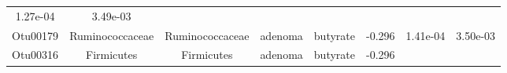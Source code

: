\documentclass[11pt,]{article}
\begin{document}
\begin{longtable}[]{@{}cccccccc@{}}
\begin{minipage}[t]{0.08\columnwidth}
1.27e-04\strut
\end{minipage} & \begin{minipage}[t]{0.08\columnwidth}\centering\strut
3.49e-03\strut
\end{minipage}\tabularnewline
\begin{minipage}[t]{0.08\columnwidth}\centering\strut
Otu00179\strut
\end{minipage} & \begin{minipage}[t]{0.15\columnwidth}\centering\strut
Ruminococcaceae\strut
\end{minipage} & \begin{minipage}[t]{0.15\columnwidth}\centering\strut
Ruminococcaceae\strut
\end{minipage} & \begin{minipage}[t]{0.08\columnwidth}\centering\strut
adenoma\strut
\end{minipage} & \begin{minipage}[t]{0.09\columnwidth}\centering\strut
butyrate\strut
\end{minipage} & \begin{minipage}[t]{0.07\columnwidth}\centering\strut
-0.296\strut
\end{minipage} & \begin{minipage}[t]{0.08\columnwidth}\centering\strut
1.41e-04\strut
\end{minipage} & \begin{minipage}[t]{0.08\columnwidth}\centering\strut
3.50e-03\strut
\end{minipage}\tabularnewline
\begin{minipage}[t]{0.08\columnwidth}\centering\strut
Otu00316\strut
\end{minipage} & \begin{minipage}[t]{0.15\columnwidth}\centering\strut
Firmicutes\strut
\end{minipage} & \begin{minipage}[t]{0.15\columnwidth}\centering\strut
Firmicutes\strut
\end{minipage} & \begin{minipage}[t]{0.08\columnwidth}\centering\strut
adenoma\strut
\end{minipage} & \begin{minipage}[t]{0.09\columnwidth}\centering\strut
butyrate\strut
\end{minipage} & \begin{minipage}[t]{0.07\columnwidth}\centering\strut
-0.296\strut
\end{minipage} & \begin{minipage}[t]{0.08\columnwidth}\centering\strut

\end{minipage}
\end{longtable}
\end{document}
